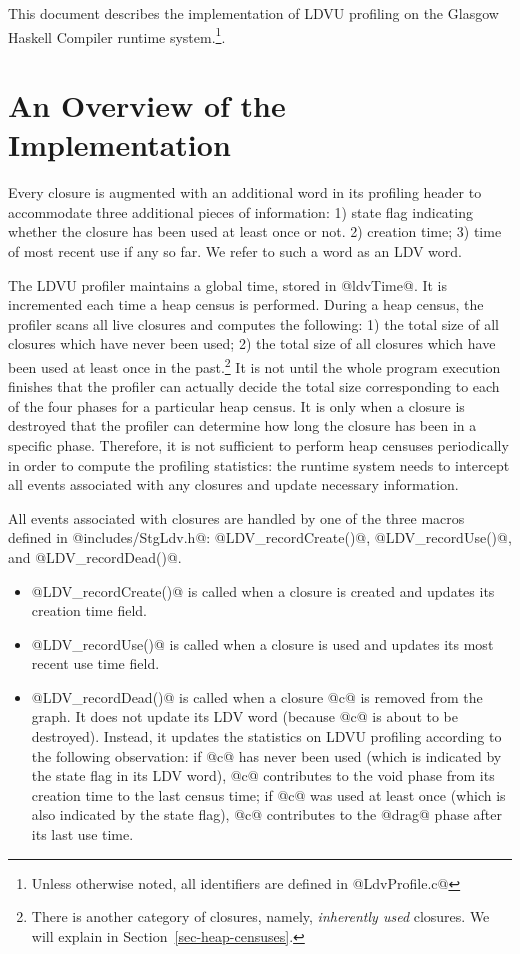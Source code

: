 \documentclass{article}
\begin{document}
This document describes the implementation of LDVU profiling on the Glasgow
Haskell Compiler runtime system.\footnote{Unless otherwise noted, all identifiers
are defined in @LdvProfile.c@}.

\section{An Overview of the Implementation}

Every closure is augmented with an additional word in its profiling header
to accommodate three additional pieces of information: 
1) state flag indicating whether the closure has been used at least once or not.
2) creation time; 3) time of most recent use if any so far.
We refer to such a word as an LDV word.

The LDVU profiler maintains a global time, stored in @ldvTime@.
It is incremented each time a heap census is performed.
During a heap census, the profiler scans all live closures and computes the 
following: 
1) the total size of all closures which have never been used; 
2) the total size of all closures which have been used at least once 
in the past.\footnote{There is another category of closures, namely, 
\emph{inherently used} closures. We will explain 
in Section~\ref{sec-heap-censuses}.}
It is not until the whole program execution finishes that the profiler 
can actually decide the total size corresponding to each of the four phases for
a particular heap census. It is only when a closure is destroyed that the profiler
can determine how long the closure has been in a specific phase. 
Therefore, it is not sufficient to perform heap censuses periodically in order to
compute the profiling statistics: the runtime system needs to intercept
all events associated with any closures and update necessary information.

All events associated with closures are handled by one of the three 
macros defined
in @includes/StgLdv.h@: @LDV_recordCreate()@, @LDV_recordUse()@, and 
@LDV_recordDead()@.

\begin{itemize}
\item{@LDV_recordCreate()@} is called when a closure is created and updates its 
creation time field.

\item{@LDV_recordUse()@} is called when a closure is used and updates its most recent
use time field.

\item{@LDV_recordDead()@} is called when a closure @c@ is removed from the graph.
It does not update its LDV word (because @c@ is about to be destroyed).
Instead, it updates the statistics on LDVU profiling according to the following
observation:
if @c@ has never been used (which is indicated by the state flag in its LDV 
word), 
@c@ contributes to the void phase from its creation time to the last census
time; if @c@ was used at least once (which is also indicated by the state flag),
@c@ contributes to the @drag@ phase after its last use time. 
\end{itemize}
\end{document}
